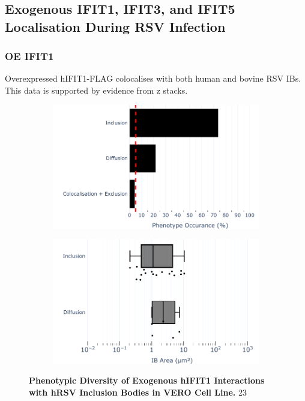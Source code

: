 \subsection{Exogenous IFIT1, IFIT3, and IFIT5 Localisation  During RSV Infection} \label{subsec:Exogenous IFIT1, IFIT3, and IFIT5 Localisation  During RSV Infection}
\subsubsection{OE IFIT1}
Overexpressed hIFIT1-FLAG colocalises with both human and bovine RSV IBs. This data is supported by evidence from z stacks.

\begin{figure}
    \begin{subfigure}{0.495\textwidth}
        \caption{}
        \includegraphics[width=1\linewidth]{09. Chapter 4/Figs/04. Overexpression/01. IFIT1/01. bar_i1_hrsv.pdf} 
    \end{subfigure}
    \begin{subfigure}{0.495\textwidth}
        \caption{}
        \includegraphics[width=1\linewidth]{09. Chapter 4/Figs/04. Overexpression/01. IFIT1/02. box_i1_hrsv.pdf}
    \end{subfigure}
    \caption[Phenotypic Diversity of Exogenous hIFIT1 Interactions with hRSV Inclusion Bodies in VERO Cell Line.]{\textbf{Phenotypic Diversity of Exogenous hIFIT1 Interactions with hRSV Inclusion Bodies in VERO Cell Line.} 23}
    \label{fig:Phenotypic Diversity of Exogenous hIFIT1 Interactions with hRSV Inclusion Bodies in VERO Cell Line}
\end{figure}


